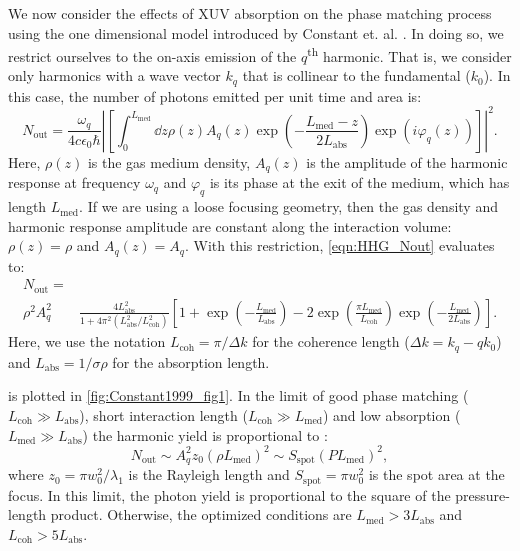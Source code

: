 We now consider the effects of XUV absorption on the phase matching process using the one dimensional model introduced by Constant et. al. \cite{constantOptimizingHighHarmonic1999}. In doing so, we restrict ourselves to the on-axis emission of the $q$\textsuperscript{th} harmonic. That is, we consider only harmonics with a wave vector $k_q$ that is collinear to the fundamental ($k_0$). In this case, the number of photons emitted per unit time and area is:
\begin{equation}
N_{\textrm{out}} = \frac{\omega_q}{4 c \epsilon_0 \hbar} \left| \left[ \int_{0}^{L_{\textrm{med}}} \dd{z} \rho(z) A_q(z) \exp \left( - \frac{L_{\textrm{med}} - z}{2 L_{\textrm{abs}}}  \right) \exp \left( i \varphi_q(z) \right)  \right] \right|^2.
\label{eqn:HHG_Nout}
\end{equation}
Here, $\rho(z)$ is the gas medium density, $A_q(z)$ is the amplitude of the harmonic response at frequency $\omega_q$ and $\varphi_q$ is its phase at the exit of the medium, which has length $L_{\textrm{med}}$. If we are using a loose focusing geometry, then the gas density and harmonic response amplitude are constant along the interaction volume: $\rho(z) = \rho$ and $A_q(z)=A_q$. With this restriction, \cref{eqn:HHG_Nout} evaluates to:
\begin{equation}
\begin{aligned}
N_{\textrm{out}} = & \\ \rho^2 A_q^2 & \frac{4L_{\textrm{abs}}^2}{1+4\pi^2(L_{\textrm{abs}}^2 / L_{\textrm{coh}}^2)} \left[ 1 + \exp\left(-\frac{L_{\textrm{med}}}{L_{\textrm{abs}}}\right) - 2 \exp\left(\frac{\pi L_{\textrm{med}}}{L_{\textrm{coh}}}\right) \exp\left(-\frac{L_{\textrm{med}}}{2L_{\textrm{abs}}}\right) \right].
\label{eqn:HHG_Nout_simple}
\end{aligned}
\end{equation}
Here, we use the notation $L_{\textrm{coh}} = \pi/\Delta k$ for the coherence length ($\Delta k = k_q - q k_0$) and $L_{\textrm{abs}} = 1/{\sigma \rho}$ for the absorption length.

 is plotted in \cref{fig:Constant1999_fig1}. In the limit of good phase matching ($L_{\textrm{coh}} \gg L_{\textrm{abs}}$), short interaction length ($L_{\textrm{coh}} \gg L_{\textrm{med}}$) and low absorption ($L_{\textrm{med}} \gg L_{\textrm{abs}}$) the harmonic yield is proportional to \cite{takahashiGenerationStrongOptical2004}:
\begin{equation}
N_{\textrm{out}} \sim A_q^2 z_0 (\rho L_{\textrm{med}})^2 \sim S_{\textrm{spot}} (P L_{\textrm{med}})^2,
\label{eqn:HHG_Nout_2}
\end{equation}
where $z_0 = \pi w_0^2 / \lambda_1$ is the Rayleigh length and $S_{\textrm{spot}} = \pi w_0^2$ is the spot area at the focus. In this limit, the photon yield is proportional to the square of the pressure-length product. Otherwise, the optimized conditions are $L_{\textrm{med}} > 3 L_{\textrm{abs}}$ and $L_{\textrm{coh}} > 5 L_{\textrm{abs}}$.

